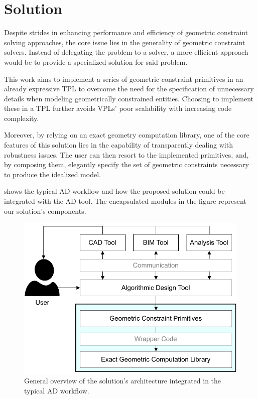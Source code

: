 \section{Solution}%
\label{sec:solution}

Despite strides in enhancing performance and efficiency of geometric constraint
solving approaches, the core issue lies in the generality of geometric
constraint solvers.  Instead of delegating the problem to a solver, a more
efficient approach would be to provide a specialized solution for said problem.

This work aims to implement a series of geometric constraint primitives in an
already expressive \ac{TPL} to overcome the need for the specification of
unnecessary details when modeling geometrically constrained entities.  Choosing
to implement these in a \ac{TPL} further avoids \acp{VPL}' poor scalability with
increasing code complexity.

Moreover, by relying on an exact geometry computation library, one of the core
features of this solution lies in the capability of transparently dealing with
robustness issues.  The user can then resort to the implemented primitives, and,
by composing them, elegantly specify the set of geometric constraints necessary
to produce the idealized model.

 shows the typical \ac{AD} workflow and how the proposed
solution could be integrated with the \ac{AD} tool.  The encapsulated modules in
the figure represent our solution's components.

\begin{figure}[htb]
  \includegraphics[width=\linewidth]{fig/solution-arch}
  \caption[Solution architecture within AD workflow]{
    General overview of the solution's architecture integrated in the typical
    \acs{AD} workflow.}%
  \label{fig:solution.arch}
\end{figure}



